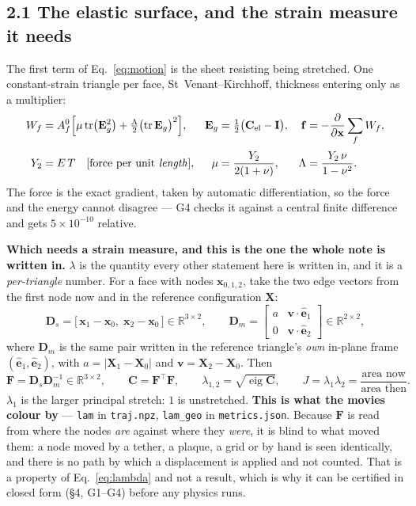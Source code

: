 \documentclass[10pt,a4paper]{article}
\newcommand{\code}[1]{\texttt{#1}}
\begin{document}
\subsection*{2.1\; The elastic surface, and the strain measure it needs}

The first term of Eq.~\eqref{eq:motion} is the sheet resisting being stretched. One constant-strain
triangle per face, St~Venant--Kirchhoff, thickness entering only as a multiplier:
%
\begin{align}
W_f &= A^0_f\Bigl[\mu\operatorname{tr}\bigl(\mathbf E_g^2\bigr)
      +\tfrac{\Lambda}{2}\bigl(\operatorname{tr}\mathbf E_g\bigr)^2\Bigr],
&\mathbf E_g&=\tfrac12\bigl(\mathbf C_{\rm el}-\mathbf I\bigr),
&\mathbf f&=-\frac{\partial}{\partial\mathbf x}\sum_f W_f ,
\label{eq:energy}\\[2pt]
Y_2&=E\,T\quad\text{[force per unit \emph{length}]},
&\mu&=\frac{Y_2}{2(1+\nu)},
&\Lambda&=\frac{Y_2\,\nu}{1-\nu^2} .
\label{eq:moduli}
\end{align}
%
The force is the exact gradient, taken by automatic differentiation, so the force and the energy cannot
disagree --- G4 checks it against a central finite difference and gets $5\times10^{-10}$ relative.

\textbf{Which needs a strain measure, and this is the one the whole note is written in.}
$\lambda$ is the quantity every other statement here is written in, and it is a \emph{per-triangle}
number. For a face with nodes $\mathbf x_{0,1,2}$, take the two edge vectors from the first node now and
in the reference configuration $\mathbf X$:
%
\begin{equation}
\mathbf D_s = \bigl[\,\mathbf x_1-\mathbf x_0,\;\mathbf x_2-\mathbf x_0\,\bigr]\in\mathbb R^{3\times2},
\qquad
\mathbf D_m = \begin{bmatrix} a & \mathbf v\!\cdot\!\hat{\mathbf e}_1\\[2pt]
0 & \mathbf v\!\cdot\!\hat{\mathbf e}_2\end{bmatrix}\in\mathbb R^{2\times2},
\label{eq:frames}
\end{equation}
%
where $\mathbf D_m$ is the same pair written in the reference triangle's \emph{own} in-plane frame
$(\hat{\mathbf e}_1,\hat{\mathbf e}_2)$, with $a=|\mathbf X_1-\mathbf X_0|$ and $\mathbf v=\mathbf X_2-
\mathbf X_0$. Then
%
\begin{equation}
\mathbf F = \mathbf D_s\mathbf D_m^{-1}\in\mathbb R^{3\times2},\qquad
\mathbf C = \mathbf F^{\!\top}\mathbf F,\qquad
\lambda_{1,2}=\sqrt{\operatorname{eig}\mathbf C},\qquad
J=\lambda_1\lambda_2=\frac{\text{area now}}{\text{area then}} .
\label{eq:lambda}
\end{equation}
%
$\lambda_1$ is the larger principal stretch: $1$ is unstretched. \textbf{This is what the movies colour
by} --- \code{lam} in \code{traj.npz}, \code{lam\_geo} in \code{metrics.json}. Because $\mathbf F$ is
read from where the nodes \emph{are} against where they \emph{were}, it is blind to what moved them: a
node moved by a tether, a plaque, a grid or by hand is seen identically, and there is no path by which a
displacement is applied and not counted. That is a property of Eq.~\eqref{eq:lambda} and not a result,
which is why it can be certified in closed form (\S4, G1--G4) before any physics runs.
\end{document}
